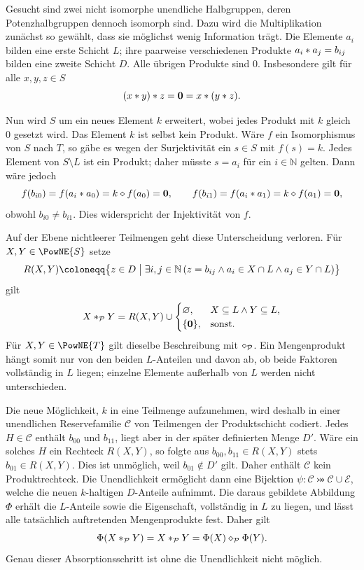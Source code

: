 \documentclass[main.tex]{subfiles}
\begin{document}
\begin{remark}
Gesucht sind zwei nicht isomorphe unendliche Halbgruppen, deren
Potenzhalbgruppen dennoch isomorph sind. Dazu wird die Multiplikation zunächst
so gewählt, dass sie möglichst wenig Information trägt. Die Elemente \(a_i\)
bilden eine erste Schicht \(L\); ihre paarweise verschiedenen Produkte
\(a_i\mathbin{\ast} a_j=b_{ij}\) bilden eine zweite Schicht \(D\). Alle übrigen
Produkte sind \(0\). Insbesondere gilt für alle \(x,y,z\in S\)
\[
  (x\mathbin{\ast} y)\mathbin{\ast} z
  =\mathbf0
  =x\mathbin{\ast}(y\mathbin{\ast} z).
\]

Nun wird \(S\) um ein neues Element \(k\) erweitert, wobei jedes Produkt mit
\(k\) gleich \(0\) gesetzt wird. Das Element \(k\) ist selbst kein Produkt.
Wäre \(f\) ein Isomorphismus von \(S\) nach \(T\), so gäbe es wegen der
Surjektivität ein \(s\in S\) mit \(f(s)=k\). Jedes Element von
\(S\setminus L\) ist ein Produkt; daher müsste \(s=a_i\) für ein
\(i\in\mathbb N\) gelten. Dann
wäre jedoch
\[
  f(b_{i0})=f(a_i\mathbin{\ast} a_0)
    =k\mathbin{\diamond} f(a_0)=\mathbf0,
  \qquad
  f(b_{i1})=f(a_i\mathbin{\ast} a_1)
    =k\mathbin{\diamond} f(a_1)=\mathbf0,
\]
obwohl \(b_{i0}\neq b_{i1}\). Dies widerspricht der Injektivität von \(f\).

Auf der Ebene nichtleerer Teilmengen geht diese Unterscheidung verloren. Für
\(X,Y\in\PowNE{S}\) setze
\[
  R(X,Y)\coloneqq
  \bigl\{z\in D\bigm|
    \exists i,j\in\mathbb N\,
      (z=b_{ij}\land a_i\in X\cap L\land a_j\in Y\cap L)\bigr\}
\]
gilt
\[
  X\mathbin{\ast}_{\mathcal P}Y
  =R(X,Y)\cup
  \begin{cases}
    \varnothing,&X\subseteq L\land Y\subseteq L,\\
    \{\mathbf0\},&\text{sonst}.
  \end{cases}
\]
Für \(X,Y\in\PowNE{T}\) gilt dieselbe Beschreibung mit
\(\mathbin{\diamond}_{\mathcal P}\). Ein Mengenprodukt hängt somit nur von den
beiden \(L\)-Anteilen und davon ab, ob beide Faktoren vollständig in \(L\)
liegen; einzelne Elemente außerhalb von \(L\) werden nicht unterschieden.

Die neue Möglichkeit, \(k\) in eine Teilmenge aufzunehmen, wird deshalb in
einer unendlichen Reservefamilie \(\mathcal C\) von Teilmengen der
Produktschicht codiert. Jedes \(H\in\mathcal C\) enthält \(b_{00}\) und
\(b_{11}\), liegt aber in der später definierten Menge \(D'\). Wäre ein solches
\(H\) ein Rechteck \(R(X,Y)\), so folgte aus
\(b_{00},b_{11}\in R(X,Y)\) stets \(b_{01}\in R(X,Y)\). Dies ist unmöglich,
weil \(b_{01}\notin D'\) gilt. Daher enthält \(\mathcal C\) kein
Produktrechteck.
Die Unendlichkeit ermöglicht dann eine Bijektion
\(\psi\colon\mathcal C\bij\mathcal C\cup\mathcal E\), welche die neuen
\(k\)-haltigen \(D\)-Anteile aufnimmt. Die daraus gebildete Abbildung \(\Phi\)
erhält die \(L\)-Anteile sowie die Eigenschaft, vollständig in \(L\) zu liegen,
und lässt alle tatsächlich auftretenden Mengenprodukte fest. Daher gilt
\[
  \Phi(X\mathbin{\ast}_{\mathcal P}Y)
  =X\mathbin{\ast}_{\mathcal P}Y
  =\Phi(X)\mathbin{\diamond}_{\mathcal P}\Phi(Y).
\]
Genau dieser Absorptionsschritt ist ohne die Unendlichkeit nicht möglich.
\end{remark}
\end{document}
